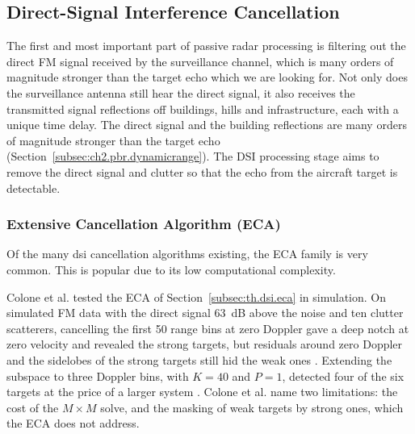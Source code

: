 \subsection{Direct-Signal Interference Cancellation}
\label{subsec:ch2.chain.dsi}
The first and most important part of passive radar processing is filtering out the direct FM signal received by the surveillance channel, which is many orders of magnitude stronger than the target echo which we are looking for. Not only does the surveillance antenna still hear the direct signal, it also receives the transmitted signal reflections off buildings, hills and infrastructure, each with a unique time delay. The direct signal and the building reflections are many orders of magnitude stronger than the target echo (Section~\ref{subsec:ch2.pbr.dynamicrange}). The DSI processing stage aims to remove the direct signal and clutter so that the echo from the aircraft target is detectable.

\subsubsection{Extensive Cancellation Algorithm (ECA)}
\label{subsubsec:ch2.chain.dsi.eca}

Of the many \gls{dsi} cancellation algorithms existing, the ECA family is very common. This is popular due to its low computational complexity. 

Colone et al. \citep{colone2009} tested the ECA of Section~\ref{subsec:th.dsi.eca} in simulation. On simulated FM data with the direct signal 63~dB above the noise and ten clutter scatterers, cancelling the first 50 range bins at zero Doppler gave a deep notch at zero velocity and revealed the strong targets, but residuals around zero Doppler and the sidelobes of the strong targets still hid the weak ones \citep{colone2009}. Extending the subspace to three Doppler bins, with $K = 40$ and $P = 1$, detected four of the six targets at the price of a larger system \citep{colone2009}. Colone et al. \citep{colone2009} name two limitations: the cost of the $M \times M$ solve, and the masking of weak targets by strong ones, which the ECA does not address.

